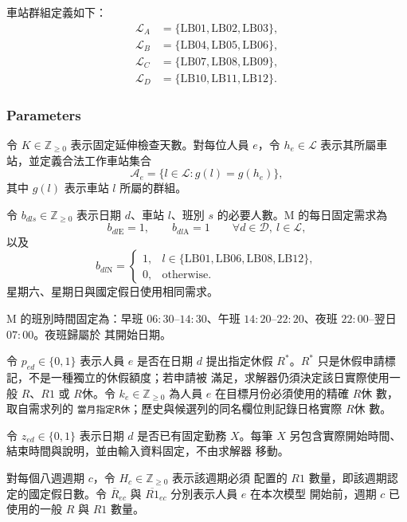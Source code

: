 \documentclass[12pt]{article}
\begin{document}
車站群組定義如下：
\[
  \begin{aligned}
    \mathcal{L}_{A}&=\{\mathrm{LB01},\mathrm{LB02},\mathrm{LB03}\},\\
    \mathcal{L}_{B}&=\{\mathrm{LB04},\mathrm{LB05},\mathrm{LB06}\},\\
    \mathcal{L}_{C}&=\{\mathrm{LB07},\mathrm{LB08},\mathrm{LB09}\},\\
    \mathcal{L}_{D}&=\{\mathrm{LB10},\mathrm{LB11},\mathrm{LB12}\}.
  \end{aligned}
\]

\subsubsection{Parameters}

令 \(K\in\mathbb{Z}_{\geq 0}\) 表示固定延伸檢查天數。對每位人員
\(e\)，令 \(h_e\in\mathcal{L}\) 表示其所屬車站，並定義合法工作車站集合
\[
  \mathcal{A}_e
  =
  \{l\in\mathcal{L}:g(l)=g(h_e)\},
\]
其中 \(g(l)\) 表示車站 \(l\) 所屬的群組。

令 \(b_{dls}\in\mathbb{Z}_{\geq 0}\) 表示日期 \(d\)、車站 \(l\)、班別
\(s\) 的必要人數。M 的每日固定需求為
\[
  b_{dl\mathrm{E}}=1,
  \qquad
  b_{dl\mathrm{A}}=1
  \qquad
  \forall d\in\mathcal{D},\ l\in\mathcal{L},
\]
以及
\[
  b_{dl\mathrm{N}}
  =
  \begin{cases}
    1, & l\in\{\mathrm{LB01},\mathrm{LB06},\mathrm{LB08},\mathrm{LB12}\},\\
    0, & \text{otherwise}.
  \end{cases}
\]
星期六、星期日與國定假日使用相同需求。

M 的班別時間固定為：早班 \(06{:}30\)--\(14{:}30\)、午班
\(14{:}20\)--\(22{:}20\)、夜班 \(22{:}00\)--翌日 \(07{:}00\)。夜班歸屬於
其開始日期。

令 \(p_{ed}\in\{0,1\}\) 表示人員 \(e\) 是否在日期 \(d\) 提出指定休假
\(R^*\)。\(R^*\) 只是休假申請標記，不是一種獨立的休假額度；若申請被
滿足，求解器仍須決定該日實際使用一般 \(R\)、\(R1\) 或 \(R休\)。令
\(k_e\in\mathbb Z_{\geq0}\) 為人員 \(e\) 在目標月份必須使用的精確 \(R休\) 數，
取自需求列的 \texttt{當月指定R休}；歷史與候選列的同名欄位則記錄日格實際 \(R休\) 數。

令 \(z_{ed}\in\{0,1\}\) 表示日期 \(d\) 是否已有固定勤務 \(X\)。每筆
\(X\) 另包含實際開始時間、結束時間與說明，並由輸入資料固定，不由求解器
移動。

對每個八週週期 \(c\)，令 \(H_c\in\mathbb{Z}_{\geq 0}\) 表示該週期必須
配置的 \(R1\) 數量，即該週期認定的國定假日數。令
\(\overline{R}_{ec}\) 與 \(\overline{R1}_{ec}\) 分別表示人員 \(e\) 在本次模型
開始前，週期 \(c\) 已使用的一般 \(R\) 與 \(R1\) 數量。
\end{document}
